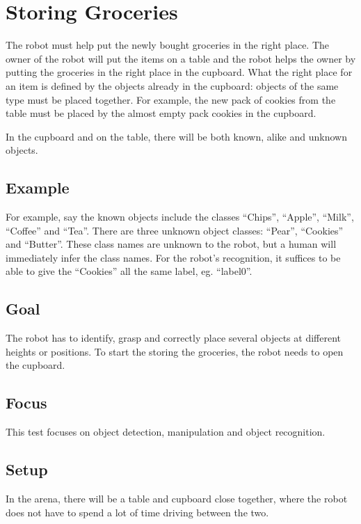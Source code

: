 \section{Storing Groceries}

The robot must help put the newly bought groceries in the right place.
The owner of the robot will put the items on a table and the robot helps the owner by putting the groceries in the right place in the cupboard.
What the right place for an item is defined by the objects already in the cupboard: objects of the same type must be placed together.
For example, the new pack of cookies from the table must be placed by the almost empty pack cookies in the cupboard.

In the cupboard and on the table, there will be both known, alike and unknown objects. 

\subsection{Example}
For example, say the known objects include the classes ``Chips'', ``Apple'', ``Milk'', ``Coffee'' and ``Tea''. 
There are three unknown object classes: ``Pear'', ``Cookies'' and ``Butter''.
These class names are unknown to the robot, but a human will immediately infer the class names.
For the robot's recognition, it suffices to be able to give the ``Cookies'' all the same label, eg. ``label0''. 

\subsection{Goal}
The robot has to identify, grasp and correctly place several objects at different heights or positions.
To start the storing the groceries, the robot needs to open the cupboard. 

\subsection{Focus}
This test focuses on object detection, manipulation and object recognition.

\subsection{Setup}
In the arena, there will be a table and cupboard close together, where the robot does not have to spend a lot of time driving between the two. 


